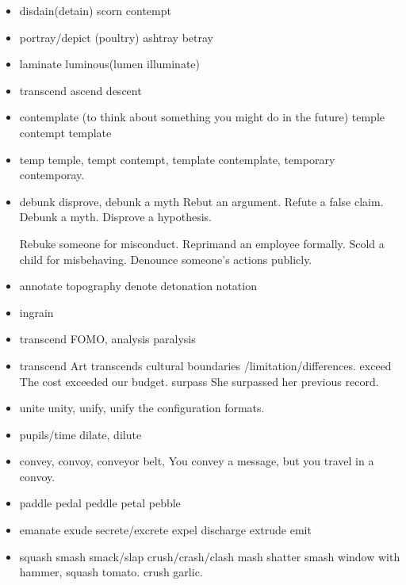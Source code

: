 \documentclass[a4paper,11pt,twoside]{book}
\begin{document}
\begin{itemize}
	\item disdain(detain) scorn contempt
	
	\item portray/depict (poultry) ashtray betray 
	
	\item laminate luminous(lumen illuminate)

	\item transcend ascend descent

	\item contemplate (to think about something you might do in the future) temple contempt template
	
	\item temp temple,  tempt contempt, template contemplate, temporary contemporay.

	\item debunk disprove, debunk a myth 
	Rebut an argument.	
	Refute a false claim.	
	Debunk a myth.	
	Disprove a hypothesis.
	
	Rebuke someone for misconduct.
	Reprimand an employee formally.
	Scold a child for misbehaving.
	Denounce someone's actions publicly.

	\item annotate topography denote detonation notation

	\item ingrain
	
	\item transcend FOMO, analysis paralysis
	
	\item transcend Art transcends cultural boundaries /limitation/differences.
	exceed The cost exceeded our budget.
	surpass She surpassed her previous record.

	\item unite unity, unify, unify the configuration formats.

	\item pupils/time dilate, dilute 

	\item convey, convoy, conveyor belt,  You convey a message, but you travel in a convoy.
	
	\item paddle pedal peddle petal pebble
	
	\item emanate exude secrete/excrete expel discharge extrude emit
	
	\item squash smash smack/slap crush/crash/clash mash shatter 
	smash window with hammer, squash tomato. crush garlic. 
	

\end{itemize}
\end{document}
